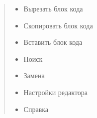 \documentclass[a4paper,10pt,russian]{sphinxmanual}
\begin{document}
\begin{quote}
\begin{itemize}
\begin{description}
\end{description}

\item {} \begin{description}
\item[{Вырезать блок кода}] \leavevmode
\noindent{}

\end{description}

\item {} \begin{description}
\item[{Скопировать блок кода}] \leavevmode
\noindent{}

\end{description}

\item {} \begin{description}
\item[{Вставить блок кода}] \leavevmode
\noindent{}

\end{description}

\item {} \begin{description}
\item[{Поиск}] \leavevmode
\noindent{}

\end{description}

\item {} \begin{description}
\item[{Замена}] \leavevmode
\noindent{}

\end{description}

\item {} \begin{description}
\item[{Настройки редактора}] \leavevmode
\noindent{}

\end{description}

\item {} \begin{description}
\item[{Справка}] \leavevmode
\noindent{}


\end{description}
\end{itemize}
\end{quote}
\end{document}
